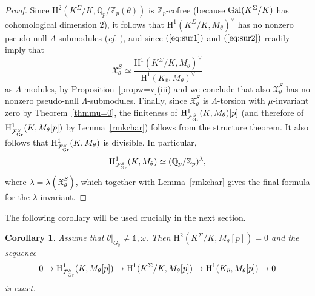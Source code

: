 \documentclass[10pt]{amsart}
\numberwithin{equation}{section}
\newtheorem{cor}[theorem]{Corollary}
\theoremstyle{definition}
\theoremstyle{remark}
\newcommand{\Fcal}{\mathcal{F}}
\newcommand{\bZ}{\mathbb{Z}}
\newcommand{\bQ}{\mathbb{Q}}
\newcommand{\rH}{\mathrm{H}}
\begin{document}
\begin{proof}
Since $\rH^{2}(K^{\Sigma}/K,\bQ_p/\bZ_p(\theta))$ is $\bZ_p$-cofree (because ${\rm Gal}(K^\Sigma/K)$ has cohomological dimension $2$), it follows that $\rH^{1}(K^{\Sigma}/K,M_\theta)^\vee$ has no nonzero pseudo-null $\Lambda$-submodules (\emph{cf.} \cite[Prop.~5]{greenberg-iwasawa}), and since $(\ref{eq:sur1})$ and $(\ref{eq:sur2})$ readily imply that
\[
\mathfrak{X}_\theta^{S}\simeq\frac{\rH^1(K^\Sigma/K,M_\theta)^\vee}{\rH^1(K_{\bar{v}},M_\theta)^\vee}
\]
as $\Lambda$-modules, by Proposition~\ref{propw=v}(iii) and \cite[Lem.~2.6]{greenvats} we conclude that also $\mathfrak{X}_\theta^S$ has no nonzero pseudo-null $\Lambda$-submodules. Finally, since $\mathfrak{X}_\theta^S$ is $\Lambda$-torsion with $\mu$-invariant zero by Theorem~\ref{thmmu=0}, the finiteness of $\rH^{1}_{\Fcal^{S}_{\rm Gr}}(K,M_\theta)[p]$ (and therefore of $\rH^{1}_{\Fcal^{S}_{\rm Gr}}(K,M_\theta[p])$ by Lemma~\ref{rmkchar}) follows from the structure theorem. It also follows that 
$\rH^1_{\mathcal{F}_{\rm Gr}^S}(K,M_\theta)$ is divisible. In particular,
\[
\rH^1_{\mathcal{F}_{\rm Gr}^S}(K,M_\theta)\simeq(\bQ_p/\bZ_p)^{\lambda},%
\]
where $\lambda=\lambda(\mathfrak{X}_\theta^S)$, which together with Lemma~\ref{rmkchar} gives the final formula for the $\lambda$-invariant.
\end{proof}

The following corollary will be used crucially in the next section.

\begin{cor}\label{corcharacters} 
Assume that $\theta\vert_{G_{\bar{v}}}\neq\mathds{1},\omega$. Then 
$\rH^{2}(K^{\Sigma}/K,M_\theta[p])=0$ and the sequence
\[
0\rightarrow\rH^1_{\Fcal_{\rm Gr}^S}(K,M_\theta[p])\rightarrow\rH^1(K^\Sigma/K,M_\theta[p])\rightarrow\rH^1(K_{\bar{v}},M_\theta[p])\rightarrow 0
\]
is exact.
\end{cor}
\end{document}
